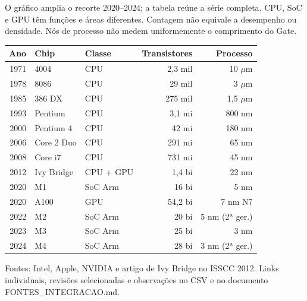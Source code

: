 \documentclass[10pt,a4paper]{article}
\begin{document}
\begin{minipage}[t]{.48\linewidth}\vspace{0pt}\centering{}\par\smallskip\footnotesize O gráfico amplia o recorte 2020--2024; a tabela reúne a série completa. CPU, SoC e GPU têm funções e áreas diferentes. Contagem não equivale a desempenho ou densidade. Nós de processo não medem uniformemente o comprimento do Gate.\end{minipage}\hfill
\begin{minipage}[t]{.49\linewidth}\vspace{0pt}\scriptsize\begin{tabular}{rllrr}\toprule Ano&Chip&Classe&Transistores&Processo\\\midrule
1971&4004&CPU&2,3 mil&10 $\mu$m\\
1978&8086&CPU&29 mil&3 $\mu$m\\
1985&386 DX&CPU&275 mil&1,5 $\mu$m\\
1993&Pentium&CPU&3,1 mi&800 nm\\
2000&Pentium 4&CPU&42 mi&180 nm\\
2006&Core 2 Duo&CPU&291 mi&65 nm\\
2008&Core i7&CPU&731 mi&45 nm\\
2012&Ivy Bridge&CPU + GPU&1,4 bi&22 nm\\
2020&M1&SoC Arm&16 bi&5 nm\\
2020&A100&GPU&54,2 bi&7 nm N7\\
2022&M2&SoC Arm&20 bi&5 nm (2ª ger.)\\
2023&M3&SoC Arm&25 bi&3 nm\\
2024&M4&SoC Arm&28 bi&3 nm (2ª ger.)\\
\bottomrule\end{tabular}\par\medskip\footnotesize Fontes: Intel, Apple, NVIDIA e artigo de Ivy Bridge no ISSCC 2012. Links individuais, revisões selecionadas e observações no CSV e no documento FONTES\_INTEGRACAO.md.\end{minipage}
\end{document}
